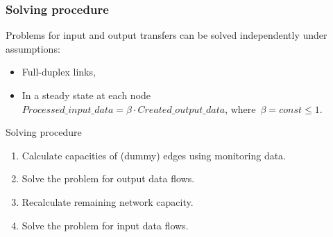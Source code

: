 \documentclass{beamer}
\begin{document}
\begin{frame}\frametitle{Solving procedure}
\begin{block}{}
Problems for input and output transfers can be solved independently under assumptions: 
\begin{itemize}
\item Full-duplex links,
\item In a steady state at each node $Processed\_input\_data= \beta \cdot Created\_output\_data$, where~$\beta = const\leq 1$.
\end{itemize}
\end{block} 

\begin{block}{Solving procedure}
\begin{enumerate}
\item Calculate capacities of (dummy) edges using monitoring data.
\item Solve the problem for output data flows.
\item Recalculate remaining network capacity.
\item Solve the problem for input data flows.
\end{enumerate}
\end{block}    
\end{frame}
\end{document}
